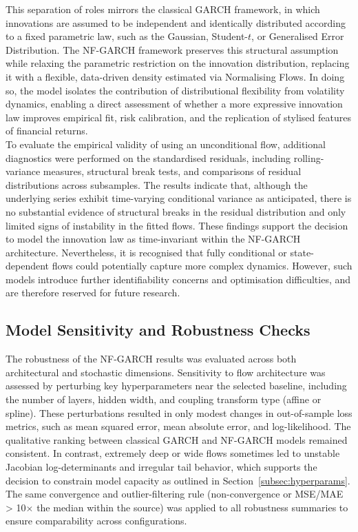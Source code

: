 \documentclass[oneside,12pt]{CUEDthesisPSnPDF}
\begin{document}
This separation of roles mirrors the classical GARCH framework, in which innovations are assumed to be independent and identically distributed according to a fixed parametric law, such as the Gaussian, Student-$t$, or Generalised Error Distribution. The NF-GARCH framework preserves this structural assumption while relaxing the parametric restriction on the innovation distribution, replacing it with a flexible, data-driven density estimated via Normalising Flows. In doing so, the model isolates the contribution of distributional flexibility from volatility dynamics, enabling a direct assessment of whether a more expressive innovation law improves empirical fit, risk calibration, and the replication of stylised features of financial returns.\\

To evaluate the empirical validity of using an unconditional flow, additional diagnostics were performed on the standardised residuals, including rolling-variance measures, structural break tests, and comparisons of residual distributions across subsamples. The results indicate that, although the underlying series exhibit time-varying conditional variance as anticipated, there is no substantial evidence of structural breaks in the residual distribution and only limited signs of instability in the fitted flows. These findings support the decision to model the innovation law as time-invariant within the NF-GARCH architecture. Nevertheless, it is recognised that fully conditional or state-dependent flows could potentially capture more complex dynamics. However, such models introduce further identifiability concerns and optimisation difficulties, and are therefore reserved for future research.\\


\subsection{Model Sensitivity and Robustness Checks}
\label{subsec:sensitivity_robustness}
\noindent
The robustness of the NF-GARCH results was evaluated across both architectural and stochastic dimensions. Sensitivity to flow architecture was assessed by perturbing key hyperparameters near the selected baseline, including the number of layers, hidden width, and coupling transform type (affine or spline). These perturbations resulted in only modest changes in out-of-sample loss metrics, such as mean squared error, mean absolute error, and log-likelihood. The qualitative ranking between classical GARCH and NF-GARCH models remained consistent. In contrast, extremely deep or wide flows sometimes led to unstable Jacobian log-determinants and irregular tail behavior, which supports the decision to constrain model capacity as outlined in Section~\ref{subsec:hyperparams}. The same convergence and outlier-filtering rule (non-convergence or MSE/MAE > 10$\times$ the median within the source) was applied to all robustness summaries to ensure comparability across configurations.\\\\
\end{document}
